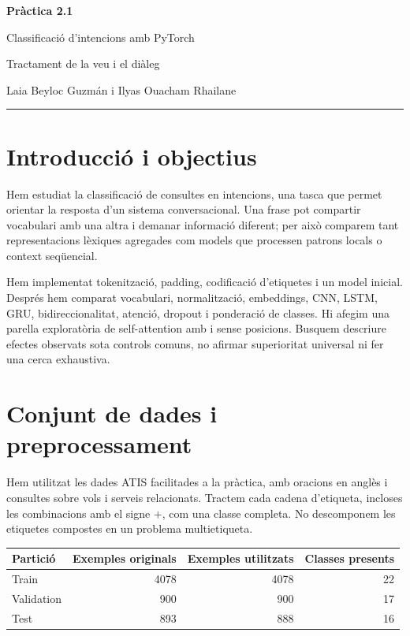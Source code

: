 \documentclass[11pt,a4paper]{article}
\begin{document}
{\color{accent}\LARGE\bfseries Pràctica 2.1\par}
{\Large Classificació d'intencions amb PyTorch\par}
\vspace{4pt}
Tractament de la veu i el diàleg\par
Laia Beyloc Guzmán i Ilyas Ouacham Rhailane\par
\vspace{5pt}\hrule\vspace{4pt}

\section{Introducció i objectius}
Hem estudiat la classificació de consultes en intencions, una tasca que permet orientar la resposta d'un sistema conversacional. Una frase pot compartir vocabulari amb una altra i demanar informació diferent; per això comparem tant representacions lèxiques agregades com models que processen patrons locals o context seqüencial.

Hem implementat tokenització, padding, codificació d'etiquetes i un model inicial. Després hem comparat vocabulari, normalització, embeddings, CNN, LSTM, GRU, bidireccionalitat, atenció, dropout i ponderació de classes. Hi afegim una parella exploratòria de self-attention amb i sense posicions. Busquem descriure efectes observats sota controls comuns, no afirmar superioritat universal ni fer una cerca exhaustiva.

\section{Conjunt de dades i preprocessament}
Hem utilitzat les dades ATIS facilitades a la pràctica, amb oracions en anglès i consultes sobre vols i serveis relacionats. Tractem cada cadena d'etiqueta, incloses les combinacions amb el signe \(+\), com una classe completa. No descomponem les etiquetes compostes en un problema multietiqueta.

\begin{center}
\begin{tabular}{lrrr}
\toprule
Partició & Exemples originals & Exemples utilitzats & Classes presents\\
\midrule
Train & 4078 & 4078 & 22\\
Validation & 900 & 900 & 17\\
Test & 893 & 888 & 16\\
\bottomrule
\end{tabular}
\end{center}
\end{document}
